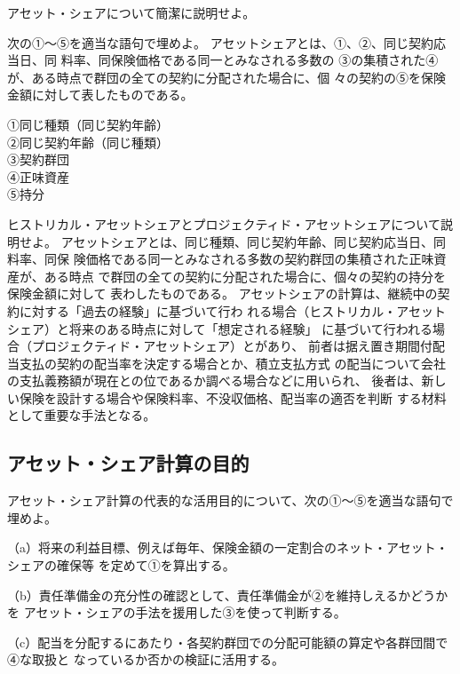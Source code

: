 \documentclass[report,gutter=10mm,fore-edge=10mm,uplatex,dvipdfmx]{jlreq}
\begin{document}
アセット・シェアについて簡潔に説明せよ。

次の①〜⑤を適当な語句で埋めよ。
アセットシェアとは、①、②、同じ契約応当日、同
料率、同保険価格である同一とみなされる多数の
③の集積された④が、ある時点で群団の全ての契約に分配された場合に、個
々の契約の⑤を保険金額に対して表したものである。

\answer{}
\noindent
①同じ種類（同じ契約年齢）\\
②同じ契約年齢（同じ種類）\\
③契約群団\\
④正味資産\\
⑤持分

ヒストリカル・アセットシェアとプロジェクティド・アセットシェアについて説明せよ。
\answer{}
アセットシェアとは、同じ種類、同じ契約年齢、同じ契約応当日、同料率、同保
険価格である同一とみなされる多数の契約群団の集積された正味資産が、ある時点
で群団の全ての契約に分配された場合に、個々の契約の持分を保険金額に対して
表わしたものである。
アセットシェアの計算は、継続中の契約に対する「過去の経験」に基づいて行わ
れる場合（ヒストリカル・アセットシェア）と将来のある時点に対して「想定される経験」
に基づいて行われる場合（プロジェクティド・アセットシェア）とがあり、
前者は据え置き期間付配当支払の契約の配当率を決定する場合とか、積立支払方式
の配当について会社の支払義務額が現在との位であるか調べる場合などに用いられ、
後者は、新しい保険を設計する場合や保険料率、不没収価格、配当率の適否を判断
する材料として重要な手法となる。

\subsection{アセット・シェア計算の目的}

アセット・シェア計算の代表的な活用目的について、次の①～⑤を適当な語句で埋めよ。

（a）将来の利益目標、例えば毎年、保険金額の一定割合のネット・アセット・シェアの確保等
を定めて①を算出する。

（b）責任準備金の充分性の確認として、責任準備金が②を維持しえるかどうかを
アセット・シェアの手法を援用した③を使って判断する。

（c）配当を分配するにあたり・各契約群団での分配可能額の算定や各群団間で④な取扱と
なっているか否かの検証に活用する。
\end{document}
